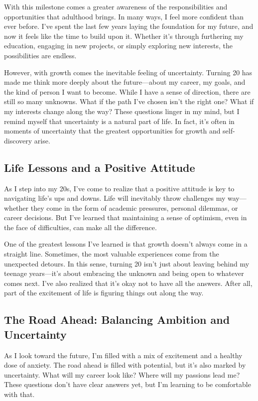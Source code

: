 \documentclass[a4paper]{article} 	%
\begin{document}
With this milestone comes a greater awareness of the responsibilities and opportunities that adulthood brings. In many ways, I feel more confident than ever before. I’ve spent the last few years laying the foundation for my future, and now it feels like the time to build upon it. Whether it’s through furthering my education, engaging in new projects, or simply exploring new interests, the possibilities are endless.

However, with growth comes the inevitable feeling of uncertainty. Turning 20 has made me think more deeply about the future—about my career, my goals, and the kind of person I want to become. While I have a sense of direction, there are still so many unknowns. What if the path I’ve chosen isn’t the right one? What if my interests change along the way? These questions linger in my mind, but I remind myself that uncertainty is a natural part of life. In fact, it’s often in moments of uncertainty that the greatest opportunities for growth and self-discovery arise.

\subsection*{Life Lessons and a Positive Attitude}

As I step into my 20s, I’ve come to realize that a positive attitude is key to navigating life’s ups and downs. Life will inevitably throw challenges my way—whether they come in the form of academic pressures, personal dilemmas, or career decisions. But I’ve learned that maintaining a sense of optimism, even in the face of difficulties, can make all the difference.

One of the greatest lessons I’ve learned is that growth doesn’t always come in a straight line. Sometimes, the most valuable experiences come from the unexpected detours. In this sense, turning 20 isn’t just about leaving behind my teenage years—it’s about embracing the unknown and being open to whatever comes next. I’ve also realized that it’s okay not to have all the answers. After all, part of the excitement of life is figuring things out along the way.

\subsection*{The Road Ahead: Balancing Ambition and Uncertainty}

As I look toward the future, I’m filled with a mix of excitement and a healthy dose of anxiety. The road ahead is filled with potential, but it’s also marked by uncertainty. What will my career look like? Where will my passions lead me? These questions don’t have clear answers yet, but I’m learning to be comfortable with that.
\end{document}

